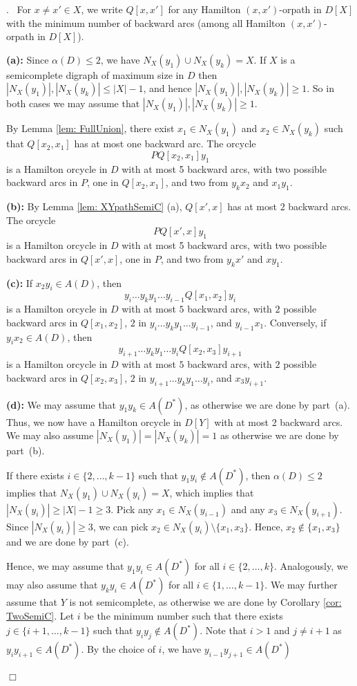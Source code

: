 \documentclass{article}
\newcommand{\2}{\vspace{2mm}}
\renewenvironment{proof}[1][]{\par \noindent {\bf Proof#1}.\ }{\hfill$\Box$
\par \vspace{11pt}}
\theoremstyle{definition}
\begin{document}
\begin{proof}
For $x \neq x' \in X$, we write $Q[x,x']$ for any Hamilton $(x,x')$-orpath in $D[X]$ with the minimum number of backward arcs (among all Hamilton $(x,x')$-orpath in $D[X]$).

\textbf{(a):} Since $\alpha(D) \le 2$, we have $N_X(y_1) \cup N_X(y_k)=X$. If $X$ is a semicomplete digraph of maximum size in $D$ then $|N_X(y_1)|,|N_X(y_k)| \le |X|-1$, and hence $|N_X(y_1)|,|N_X(y_k)| \ge 1$. So in both cases we may assume that $|N_X(y_1)|,|N_X(y_k)| \ge 1$.

By Lemma \ref{lem: FullUnion}, there exist $x_1 \in N_X(y_1)$ and $x_2 \in N_X(y_k)$ such that $Q[x_2,x_1]$ has at most one backward arc.
The orcycle 
\[
PQ[x_2,x_1]y_1
\]
is a Hamilton orcycle in $D$ with at most 5 backward arcs, with two possible backward arcs in $P$, one in $Q[x_2,x_1]$, and two from $y_kx_2$ and $x_1y_1$.

\textbf{(b):} By Lemma \ref{lem: XYpathSemiC} (a), $Q[x',x]$ has at most $2$ backward arcs. The orcycle 
\[
PQ[x',x]y_1
\]
is a Hamilton orcycle in $D$ with at most 5 backward arcs, with two possible backward arcs in $Q[x',x]$, one in $P$, and two from $y_kx'$ and $xy_1$.

\textbf{(c):} If $x_2y_i \in A(D)$, then 
\[
y_i\dots y_k y_1 \dots y_{i-1}Q[x_1,x_2]y_i
\]
is a Hamilton orcycle in $D$ with at most $5$ backward arcs, with $2$ possible backward arcs in $Q[x_1,x_2]$, $2$ in $y_i\dots y_k y_1 \dots y_{i-1}$, and $y_{i-1}x_1$. Conversely, if $y_ix_2 \in A(D)$, then 
\[
y_{i+1}\dots y_k y_1 \dots y_iQ[x_2,x_3]y_{i+1}
\]
is a Hamilton orcycle in $D$ with at most $5$ backward arcs, with $2$ possible backward arcs in $Q[x_2,x_3]$, $2$ in $y_{i+1}\dots y_k y_1 \dots y_i$, and $x_3y_{i+1}$.

\textbf{(d):} We may assume that $y_1y_k \in A(D^*)$, as otherwise we are done by part~(a). Thus, we now have a Hamilton orcycle in $D[Y]$ with at most 2 backward arcs. We may also assume $|N_X(y_1)| = |N_X(y_k)|=1$ as otherwise we are done by part~(b). 

If there exists $i \in \{2,\dots,k-1\}$ such that $y_1y_i \notin A(D^*)$, then $\alpha(D) \le 2$ implies that $N_X(y_1)\cup N_X(y_i)=X$, which implies that $|N_X(y_i)|\ge |X|-1 \ge 3$. 
Pick any $x_1 \in N_X(y_{i-1})$ and any $x_3 \in N_X(y_{i+1})$. Since $|N_X(y_i)| \ge 3$, we can pick $x_2 \in N_X(y_i) \setminus \{x_1,x_3\}$. Hence, $x_2 \notin \{x_1,x_3\}$ and we are done by part~(c). 

Hence, we may assume that $y_1y_i \in A(D^*)$ for all $i \in \{2,\dots,k\}$. Analogously, we may also assume that $y_ky_i \in A(D^*)$ for all $i \in \{1,\dots,k-1\}$. We may further assume that $Y$ is not semicomplete, as otherwise we are done by Corollary \ref{cor: TwoSemiC}. 
Let $i$ be the minimum number such that there exists $j \in \{i+1,\dots,k-1\}$ such that $y_iy_j \notin A(D^*)$. Note that $i>1$ and $j \neq i+1$ as $y_iy_{i+1} \in A(D^*)$. By the choice of $i$, we have $y_{i-1}y_{j+1} \in A(D^*)$


\end{proof}
\end{document}
